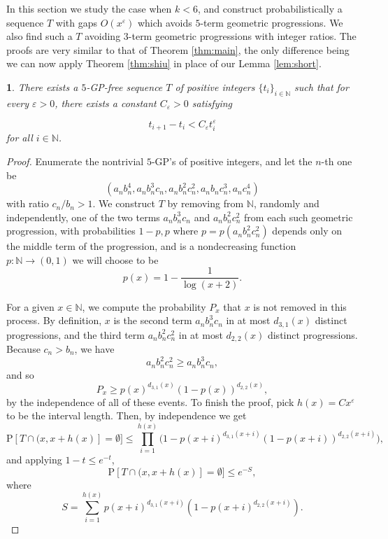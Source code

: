 \documentclass[12pt,english,BCOR7.5mm]{amsart}
\numberwithin{equation}{section}
\numberwithin{figure}{section}
\theoremstyle{definition}
\theoremstyle{plain}
\theoremstyle{plain}
\theoremstyle{plain}
\theoremstyle{definition}
\theoremstyle{plain}
\newtheorem{prop}[thm]{\protect\propositionname}
\theoremstyle{plain}
\providecommand{\propositionname}{Proposition}
\begin{document}
In this section we study the case when $k<6$, and construct probabilistically
a sequence $T$ with gaps $O(x^{\varepsilon})$ which avoids $5$-term
geometric progressions. We also find such a $T$ avoiding $3$-term
geometric progressions with integer ratios. The proofs are very similar
to that of Theorem \ref{thm:main}, the only difference being we can
now apply Theorem \ref{thm:shiu} in place of our Lemma \ref{lem:short}.
\begin{prop}
\label{5-gp}There exists a $5$-GP-free sequence $T$ of positive
integers $\{t_{i}\}_{i\in\mathbb{N}}$ such that for every $\varepsilon>0$,
there exists a constant $C_{\varepsilon}>0$ satisfying

\[
t_{i+1}-t_{i}<C_{\varepsilon}t_{i}^{\varepsilon}
\]
for all $i\in\mathbb{N}$.\end{prop}
\begin{proof}
Enumerate the nontrivial $5$-GP's of positive integers, and let the
$n$-th one be
\[
(a_{n}b_{n}^{4},a_{n}b_{n}^{3}c_{n},a_{n}b_{n}^{2}c_{n}^{2},a_{n}b_{n}c_{n}^{3},a_{n}c_{n}^{4})
\]
with ratio $c_{n}/b_{n}>1$. We construct $T$ by removing from $\mathbb{N}$,
randomly and independently, one of the two terms $a_{n}b_{n}^{3}c_{n}$
and $a_{n}b_{n}^{2}c_{n}^{2}$ from each such geometric progression,
with probabilities $1-p,p$ where $p=p(a_{n}b_{n}^{2}c_{n}^{2})$
depends only on the middle term of the progression, and is a nondecreasing
function $p:\mathbb{N}\rightarrow(0,1)$ we will choose to be 
\[
p(x)=1-\frac{1}{\log(x+2)}.
\]

For a given $x\in\mathbb{N}$, we compute the probability $P_{x}$
that $x$ is not removed in this process. By definition, $x$ is the
second term $a_{n}b_{n}^{3}c_{n}$ in at most $d_{3,1}(x)$ distinct
progressions, and the third term $a_{n}b_{n}^{2}c_{n}^{2}$ in at
most $d_{2,2}(x)$ distinct progressions. Because $c_{n}>b_{n}$,
we have
\[
a_{n}b_{n}^{2}c_{n}^{2}\geq a_{n}b_{n}^{3}c_{n},
\]
and so
\[
P_{x}\geq p(x)^{d_{3,1}(x)}(1-p(x))^{d_{2,2}(x)},
\]
by the independence of all of these events. To finish the proof, pick
$h(x)=Cx^{\varepsilon}$ to be the interval length. Then, by independence
we get
\[
\mbox{P}[T\cap(x,x+h(x)]=\emptyset]\leq\prod_{i=1}^{h(x)}\Big(1-p(x+i)^{d_{3,1}(x+i)}(1-p(x+i))^{d_{2,2}(x+i)}\Big),
\]
and applying $1-t\leq e^{-t}$,
\[
\mbox{P}[T\cap(x,x+h(x)]=\emptyset]\leq e^{-S},
\]
where
\[
S=\sum_{i=1}^{h(x)}p(x+i)^{d_{3,1}(x+i)}(1-p(x+i)^{d_{2,2}(x+i)}).
\]


\end{proof}
\end{document}
